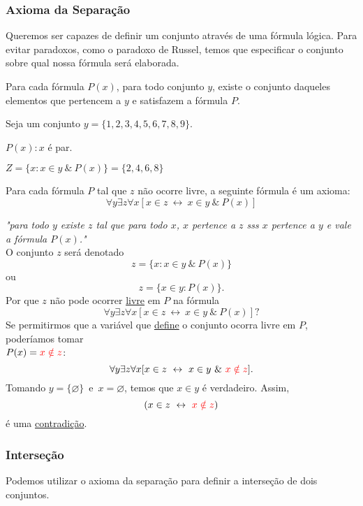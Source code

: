       \subsubsection{Axioma da Separação}
         Queremos ser capazes de definir um conjunto através de uma fórmula lógica. Para evitar paradoxos, como o paradoxo de Russel, temos que especificar o conjunto sobre qual nossa fórmula será elaborada.
         \begin{stat}
            Para cada fórmula $P(x)$, para todo conjunto $y$, existe o conjunto daqueles elementos que pertencem a $y$ e satisfazem a fórmula $P$.
         \end{stat}
         \begin{exmp}
            Seja um conjunto $y = \{1,2,3,4,5,6,7,8,9\}$.

            $P(x): x$ é par.

            $Z = \{x: x \in y\ \&\ P(x)\} = \{2,4,6,8\}$
         \end{exmp}
         \begin{definition}
            Para cada fórmula $P$ tal que $z$ não ocorre livre, a seguinte fórmula é um axioma:
            $$\forall y \exists z \forall x [x \in z\ \leftrightarrow\ x \in y\ \&\ P(x)]$$    
         \end{definition}
         \emph{"para todo $y$ existe $z$ tal que para todo $x$, $x$ pertence a $z$ sss $x$ pertence a $y$ e vale a fórmula $P(x)$."}\\
         O conjunto $z$ será denotado
         $$z = \{x: x \in y\ \&\ P(x)\}$$
         ou
         $$z = \{x \in y: P(x)\}.$$
         Por que $z$ não pode ocorrer \underline{livre} em $P$ na fórmula
         $$\forall y \exists z \forall x [x \in z\ \leftrightarrow\ x \in y\ \&\ P(x)] ?$$
         Se permitirmos que a variável que \underline{define} o conjunto ocorra livre em $P$, poderíamos tomar \\ $P(x) = \color{red}{x \notin z}$:
         $$\forall y \exists z \forall x [x \in z\ \leftrightarrow\ x \in y\ \&\ \highl{x \notin z}\color{black}].$$
         Tomando $y = \{\varnothing\}$\ e\ $x = \varnothing$, temos que $x \in y$ é verdadeiro. Assim,
         $$(x \in z\ \leftrightarrow\ \highl{x \notin z} \color{black})$$
         é uma \underline{contradição}. 

      \subsubsection*{Interseção}
         Podemos utilizar o axioma da separação para definir a interseção de dois conjuntos.

